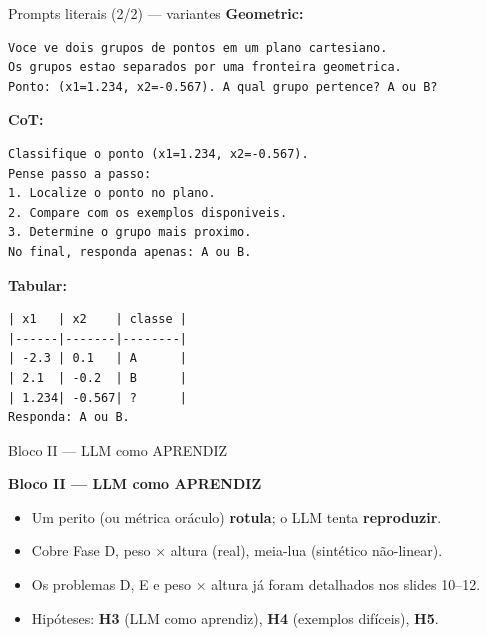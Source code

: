 \documentclass[aspectratio=169,10pt]{beamer}
\begin{document}
\begin{frame}[fragile]{Prompts literais (2/2) --- variantes}
  \tiny
  \textbf{Geometric:}
  \begin{verbatim}
Voce ve dois grupos de pontos em um plano cartesiano.
Os grupos estao separados por uma fronteira geometrica.
Ponto: (x1=1.234, x2=-0.567). A qual grupo pertence? A ou B?
  \end{verbatim}
  \textbf{CoT:}
  \begin{verbatim}
Classifique o ponto (x1=1.234, x2=-0.567).
Pense passo a passo:
1. Localize o ponto no plano.
2. Compare com os exemplos disponiveis.
3. Determine o grupo mais proximo.
No final, responda apenas: A ou B.
  \end{verbatim}
  \textbf{Tabular:}
  \begin{verbatim}
| x1   | x2    | classe |
|------|-------|--------|
| -2.3 | 0.1   | A      |
| 2.1  | -0.2  | B      |
| 1.234| -0.567| ?      |
Responda: A ou B.
  \end{verbatim}
\end{frame}

\begin{frame}{Bloco II --- LLM como APRENDIZ}
  \footnotesize
  \begin{center}
    \Large \textbf{Bloco II --- LLM como APRENDIZ}
  \end{center}
  \medskip
  \begin{itemize}
    \item Um perito (ou m\'etrica or\'aculo) \textbf{rotula}; o LLM tenta \textbf{reproduzir}.
    \item Cobre Fase D, peso $\times$ altura (real), meia-lua (sint\'etico n\~ao-linear).
    \item Os problemas D, E e peso $\times$ altura j\'a foram detalhados nos slides 10--12.
    \item Hip\'oteses: \textbf{H3} (LLM como aprendiz), \textbf{H4} (exemplos dif\'iceis), \textbf{H5}.
  \end{itemize}
\end{frame}

\end{document}
